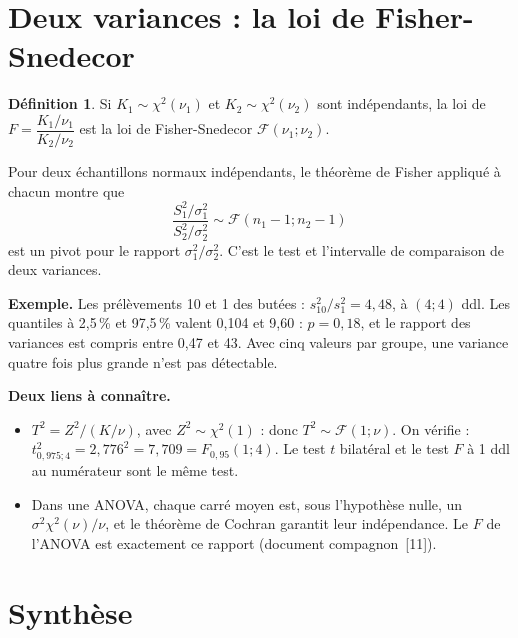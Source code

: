 \documentclass[11pt,a4paper]{article}
\theoremstyle{sj}
\theoremstyle{definition}
\newtheorem{defi}{Définition}
\theoremstyle{remark}
\newcommand{\chid}{\chi^2}
\begin{document}
\section{Deux variances : la loi de Fisher-Snedecor}\label{sec:F}

\begin{defi}
Si $K_1\sim\chid(\nu_1)$ et $K_2\sim\chid(\nu_2)$ sont indépendants, la loi de $F=\dfrac{K_1/\nu_1}{K_2/\nu_2}$ est la loi de Fisher-Snedecor $\mathcal F(\nu_1;\nu_2)$.
\end{defi}

Pour deux échantillons normaux indépendants, le théorème de Fisher appliqué à chacun montre que
\[
\frac{S_1^2/\sigma_1^2}{S_2^2/\sigma_2^2}\sim\mathcal F(n_1-1;n_2-1)
\]
est un pivot pour le rapport $\sigma_1^2/\sigma_2^2$. C'est le test et l'intervalle de comparaison de deux variances.

\textbf{Exemple.} Les prélèvements 10 et 1 des butées : $s_{10}^2/s_1^2=4{,}48$, à $(4;4)$ ddl. Les quantiles à 2,5\,\% et 97,5\,\% valent 0,104 et 9,60 : $p=0{,}18$, et le rapport des variances est compris entre 0,47 et 43. Avec cinq valeurs par groupe, une variance quatre fois plus grande n'est pas détectable.

\textbf{Deux liens à connaître.}
\begin{itemize}[leftmargin=1.4em]
\item $T^2=Z^2/(K/\nu)$, avec $Z^2\sim\chid(1)$ : donc $T^2\sim\mathcal F(1;\nu)$. On vérifie : $t_{0{,}975;4}^2=2{,}776^2=7{,}709=F_{0{,}95}(1;4)$. Le test $t$ bilatéral et le test $F$ à 1 ddl au numérateur sont le même test.
\item Dans une ANOVA, chaque carré moyen est, sous l'hypothèse nulle, un $\sigma^2\chid(\nu)/\nu$, et le théorème de Cochran garantit leur indépendance. Le $F$ de l'ANOVA est exactement ce rapport (document compagnon~[11]).
\end{itemize}

\section{Synthèse}\label{sec:synthese}
\end{document}
